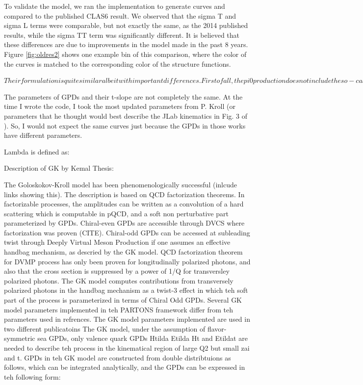     To validate the model, we ran the implementation to generate curves and compared to the published CLAS6 result. We observed that the sigma T and sigma L terms were comparable, but not exactly the same, as the 2014 published results, while the sigma TT term was significantly different. It is believed that these differences are due to improvements in the model made in the past 8 years. Figure \ref{fig:oldres2} shows one example bin of this comparison, where the color of the curves is matched to the corresponding color of the structure functions.
    
    \fi
    
    \iffalse
    
    $
    Their formulation is quite similar albeit with important differences. First of all, the pi0 production does not include the so-called pion-pole contribution (see Eq. 4.39 - 4.42 in my thesis). Moreover, their handbag contributions are slightly different. Their differences at the handbag level are discussed in Eq. 4.37 and 4.38 in my thesis. $
    
    The parameters of GPDs and their t-slope are not completely the same. At the time I wrote the code, I took the most updated parameters from P. Kroll (or parameters that he thought would best describe the JLab kinematics in Fig. 3 of \parencite{Diehl2020ExtractionKinematics} ). So, I would not expect the same curves just because the GPDs in those works have different parameters. 
    
    Lambda is defined as: %
    
    Description of GK by Kemal Thesis:
    
    The Goloskokov-Kroll model has been phenomenologically successful (inlcude links showing this).  The description is based on QCD factorization theorems. In factorizable processes, the amplitudes can be written as a convolution of a hard scattering which is computable in pQCD, and a soft non perturbative part parameterized by GPDs. Chiral-even GPDs are accessible through DVCS where factorization was proven (CITE). Chiral-odd GPDs can be accessed at subleading twist through Deeply Virtual Meson Production if one assumes an effective handbag mechanism, as descried by the GK model. 
    QCD factorization theorem for DVMP process has only been proven for longitudinally polarized photons, and also that the cross section is suppressed by a power of 1/Q for transversley polarized photons. 
    The GK model computes contributions from transversely polarized photons in the handbag mechanism as a twist-3 effect in which teh soft part of the process is parameterized in terms of Chiral Odd GPDs.
    Several GK model parameters implemented in teh PARTONS framework differ from teh parameters used in refrences. The GK model parameters implemented are used in two different publicatoins
    The GK model, under the assumption of flavor-symmetric sea GPDs, only valence quark GPDs Htilda Etilda Ht and Etildat are needed to describe teh process in the kinematical region of large Q2 but small zai and t. GPDs in teh GK model are constructed from double distribtuions as follows, which can be integrated analytically, and the GPDs can be expressed in teh following form:
    
